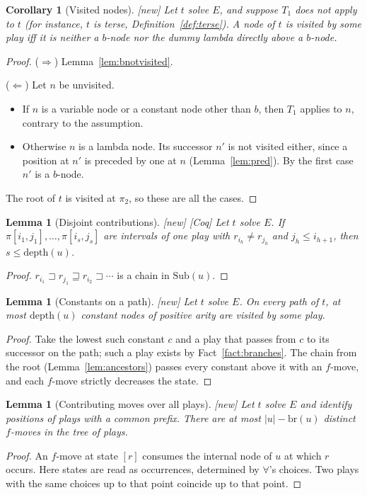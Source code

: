 \documentclass[11pt]{article}
\newcommand{\Sub}{\mathrm{Sub}}
\newcommand{\depth}{\mathrm{depth}}
\newcommand{\br}{\mathrm{br}}
\newcommand{\iv}[2]{\pi[#1,#2]}
\newcommand{\New}{\textsf{[new]}}
\newcommand{\Coq}{\textsf{[Coq]}}
\theoremstyle{plain}
\newtheorem{lemma}[theorem]{Lemma}
\newtheorem{corollary}[theorem]{Corollary}
\theoremstyle{definition}
\theoremstyle{remark}
\begin{document}
\begin{corollary}[Visited nodes]\label{cor:visited}
\New{} Let $t$ solve $E$, and suppose $T_1$ does not apply to $t$ (for
instance, $t$ is terse, Definition~\ref{def:terse}).  A node of $t$ is visited by
some play iff it is neither a $b$-node nor the dummy lambda directly
above a $b$-node.
\end{corollary}
\begin{proof}
($\Rightarrow$) Lemma~\ref{lem:bnotvisited}.

($\Leftarrow$) Let $n$ be unvisited.
\begin{itemize}
\item If $n$ is a variable node or a constant node other than $b$, then
  $T_1$ applies to $n$, contrary to the assumption.
\item Otherwise $n$ is a lambda node.  Its successor $n'$ is not visited
  either, since a position at $n'$ is preceded by one at $n$
  (Lemma~\ref{lem:pred}).  By the first case $n'$ is a $b$-node.
\end{itemize}
The root of $t$ is visited at $\pi_2$, so these are all the cases.
\end{proof}

\begin{lemma}[Disjoint contributions]\label{lem:disjoint}
\New{} \Coq{} Let $t$ solve $E$.  If
$\iv{i_1}{j_1},\dots,\iv{i_s}{j_s}$ are intervals of one play with
$r_{i_h}\ne r_{j_h}$ and $j_h\le i_{h+1}$, then $s\le\depth(u)$.
\end{lemma}
\begin{proof}
$r_{i_1}\sqsupset r_{j_1}\sqsupseteq r_{i_2}\sqsupset\cdots$ is a chain in
$\Sub(u)$.
\end{proof}

\begin{lemma}[Constants on a path]\label{lem:constants}
\New{} Let $t$ solve $E$.  On every path of $t$, at most $\depth(u)$
constant nodes of positive arity are visited by some play.
\end{lemma}
\begin{proof}
Take the lowest such constant $c$ and a play that passes from $c$ to its
successor on the path; such a play exists by Fact~\ref{fact:branches}.
The chain from the root (Lemma~\ref{lem:ancestors}) passes every
constant above it with an $f$-move, and each $f$-move strictly
decreases the state.
\end{proof}

\begin{lemma}[Contributing moves over all plays]\label{lem:global}
\New{} Let $t$ solve $E$ and identify positions of plays with a common
prefix.  There are at most $|u|-\br(u)$ distinct $f$-moves in the tree
of plays.
\end{lemma}
\begin{proof}
An $f$-move at state $[r]$ consumes the internal node of $u$ at which
$r$ occurs.  Here states are read as occurrences, determined by
$\forall$'s choices.  Two plays with the same choices up to that point
coincide up to that point.
\end{proof}
\end{document}

